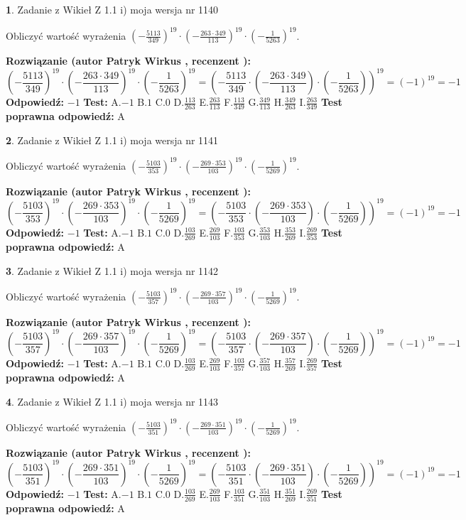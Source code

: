\documentclass[12pt, a4paper]{article}
\theoremstyle{definition} %
\newtheorem{zad}{}
\newcommand{\zadStart}[1]{\begin{zad}#1\newline}
\newcommand{\zadStop}{\end{zad}}
\newcommand{\rozwStart}[2]{\noindent \textbf{Rozwiązanie (autor #1 , recenzent #2): }\newline}
\newcommand{\rozwStop}{\newline}
\newcommand{\odpStart}{\noindent \textbf{Odpowiedź:}\newline}
\newcommand{\odpStop}{\newline}
\newcommand{\testStart}{\noindent \textbf{Test:}\newline}
\newcommand{\testStop}{\newline}
\newcommand{\kluczStart}{\noindent \textbf{Test poprawna odpowiedź:}\newline}
\newcommand{\kluczStop}{\newline}
\begin{document}
\zadStart{Zadanie z Wikieł Z 1.1 i) moja wersja nr 1140}

Obliczyć wartość wyrażenia $(-\frac{5113}{349})^{19} \cdot (-\frac{263 \cdot 349}{113})^{19} \cdot (-\frac{1}{5263})^{19}$.
\zadStop
\rozwStart{Patryk Wirkus}{}
$$(-\frac{5113}{349})^{19} \cdot (-\frac{263 \cdot 349}{113})^{19} \cdot (-\frac{1}{5263})^{19} = (-\frac{5113}{349} \cdot (-\frac{263 \cdot 349}{113}) \cdot (-\frac{1}{5263}))^{19} = (-1)^{19} = -1$$
\rozwStop
\odpStart
$-1$
\odpStop
\testStart
A.$-1$ B.$1$ C.$0$ D.$\frac{113}{263}$ E.$\frac{263}{113}$
F.$\frac{113}{349}$ G.$\frac{349}{113}$
H.$\frac{349}{263}$
I.$\frac{263}{349}$
\testStop
\kluczStart
A
\kluczStop



\zadStart{Zadanie z Wikieł Z 1.1 i) moja wersja nr 1141}

Obliczyć wartość wyrażenia $(-\frac{5103}{353})^{19} \cdot (-\frac{269 \cdot 353}{103})^{19} \cdot (-\frac{1}{5269})^{19}$.
\zadStop
\rozwStart{Patryk Wirkus}{}
$$(-\frac{5103}{353})^{19} \cdot (-\frac{269 \cdot 353}{103})^{19} \cdot (-\frac{1}{5269})^{19} = (-\frac{5103}{353} \cdot (-\frac{269 \cdot 353}{103}) \cdot (-\frac{1}{5269}))^{19} = (-1)^{19} = -1$$
\rozwStop
\odpStart
$-1$
\odpStop
\testStart
A.$-1$ B.$1$ C.$0$ D.$\frac{103}{269}$ E.$\frac{269}{103}$
F.$\frac{103}{353}$ G.$\frac{353}{103}$
H.$\frac{353}{269}$
I.$\frac{269}{353}$
\testStop
\kluczStart
A
\kluczStop



\zadStart{Zadanie z Wikieł Z 1.1 i) moja wersja nr 1142}

Obliczyć wartość wyrażenia $(-\frac{5103}{357})^{19} \cdot (-\frac{269 \cdot 357}{103})^{19} \cdot (-\frac{1}{5269})^{19}$.
\zadStop
\rozwStart{Patryk Wirkus}{}
$$(-\frac{5103}{357})^{19} \cdot (-\frac{269 \cdot 357}{103})^{19} \cdot (-\frac{1}{5269})^{19} = (-\frac{5103}{357} \cdot (-\frac{269 \cdot 357}{103}) \cdot (-\frac{1}{5269}))^{19} = (-1)^{19} = -1$$
\rozwStop
\odpStart
$-1$
\odpStop
\testStart
A.$-1$ B.$1$ C.$0$ D.$\frac{103}{269}$ E.$\frac{269}{103}$
F.$\frac{103}{357}$ G.$\frac{357}{103}$
H.$\frac{357}{269}$
I.$\frac{269}{357}$
\testStop
\kluczStart
A
\kluczStop



\zadStart{Zadanie z Wikieł Z 1.1 i) moja wersja nr 1143}

Obliczyć wartość wyrażenia $(-\frac{5103}{351})^{19} \cdot (-\frac{269 \cdot 351}{103})^{19} \cdot (-\frac{1}{5269})^{19}$.
\zadStop
\rozwStart{Patryk Wirkus}{}
$$(-\frac{5103}{351})^{19} \cdot (-\frac{269 \cdot 351}{103})^{19} \cdot (-\frac{1}{5269})^{19} = (-\frac{5103}{351} \cdot (-\frac{269 \cdot 351}{103}) \cdot (-\frac{1}{5269}))^{19} = (-1)^{19} = -1$$
\rozwStop
\odpStart
$-1$
\odpStop
\testStart
A.$-1$ B.$1$ C.$0$ D.$\frac{103}{269}$ E.$\frac{269}{103}$
F.$\frac{103}{351}$ G.$\frac{351}{103}$
H.$\frac{351}{269}$
I.$\frac{269}{351}$
\testStop
\kluczStart
A
\kluczStop
\end{document}
